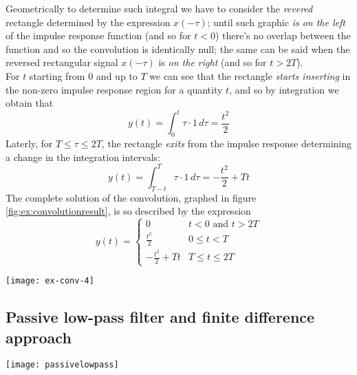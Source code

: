 		Geometrically to determine such integral we have to consider the \textit{revered} rectangle determined by the expression $x(-\tau)$; until such graphic \textit{is on the left} of the  impulse response function (and so for $t<0$) there's no overlap between the function and so the convolution is identically null; the same can be said when the reversed rectangular signal $x(-\tau)$ is \textit{on the right} (and so for $t>2T$). \\
		For $t$ starting from $0$ and up to $T$ we can see that the rectangle \textit{starts inserting} in the non-zero impulse response region for a quantity $t$, and so by integration we obtain that
		\[ y(t) = \int_0^t \tau\cdot 1\, d\tau = \frac{t^2}{2} \]
		Laterly, for $T\leq \tau \leq 2T$, the rectangle \textit{exits} from the impulse response determining a change in the integration intervals: 
		\[ y(t) = \int_{T-t}^T \tau\cdot 1\, d\tau = -\frac{t^2}{2} + Tt \]
		The complete solution of the convolution, graphed in figure \ref{fig:ex:convolutionresult}, is so described by the expression
		\[ y(t) = \begin{cases}
			0 & t < 0 \textrm{ and } t > 2T \\
			\frac{t^2}{2} & 0\leq t < T \\
			-\frac{t^2}{2} + Tt & T\leq t \leq 2T
		\end{cases} \]
		
		\begin{SCfigure}[2][bht]
			\centering \texttt{[image: ex-conv-4]} 
			\caption{output $y(t)$ of the system computed as the convolution $h(t)*x(t)$ between impulse response and input sequence. } \label{fig:ex:convolutionresult}
		\end{SCfigure}
		
		
		
		
		
		
	
	\subsection{Passive low-pass filter and finite difference approach} \label{sec:ex:lowpass}
		
		\begin{SCfigure}[2][bht]
			\centering \texttt{[image: passivelowpass]}
			\caption{schematic representation of the "common" passive low-pass filter.}
			\label{fig:ex:lowpass}
		\end{SCfigure}
		
